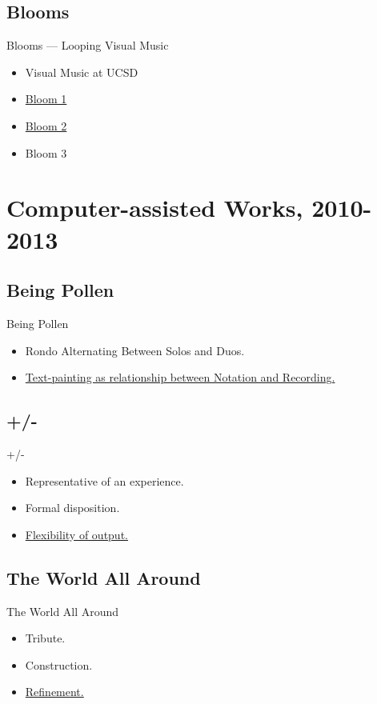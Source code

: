 \documentclass{beamer}
\begin{document}
\subsection{Blooms}
\begin{frame}{Blooms --- Looping Visual Music}
	\begin{itemize}
		\item{Visual Music at UCSD}
		\pause
		\item{{\href{bloom1}{Bloom 1}}}
		\pause
		\item{\href{bloom2}{Bloom 2}}
		\pause
		\item{Bloom 3}
	\end{itemize}
\end{frame}

\section{Computer-assisted Works, 2010-2013}
\subsection{Being Pollen}
\begin{frame}{Being Pollen}
\begin{itemize}
		\item{Rondo Alternating Between Solos and Duos.}
		\pause
		\item{\href{beingPollen}{Text-painting as relationship between Notation and Recording.}}
	\end{itemize}
\end{frame}

\subsection{+/-}
\begin{frame}{+/-}
\begin{itemize}
		\item{Representative of an experience.}
		\pause
		\item{Formal disposition.}
		\pause
		\item{\href{animation}{Flexibility of output.}}
	\end{itemize}
\end{frame}
\subsection{The World All Around}

\begin{frame}{The World All Around}

\begin{itemize}
		\item{Tribute.}
		\pause
		\item{Construction.}
		\pause
		\item{\href{worldFirst}{Refinement.}}
	\end{itemize}

\end{frame}
\end{document}
